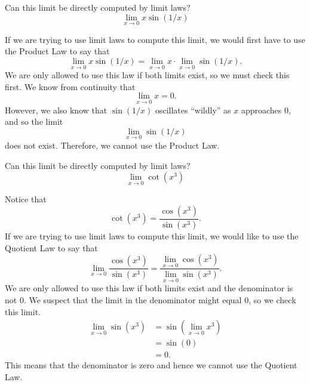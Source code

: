 \documentclass{ximera}
\begin{document}
\begin{question}
  Can this limit be directly computed by limit laws?
  \[
  \lim_{x\to 0} x\sin(1/x)
  \]
  \begin{multipleChoice}
  \end{multipleChoice}
  \begin{feedback}
    If we are trying to use limit laws to compute this limit, we would
    first have to use the Product Law to say that
    \[
    \lim_{x\to 0}x\sin(1/x)= \lim_{x\to 0} x \cdot \lim_{x\to 0} \sin(1/x).
    \]
    We are only allowed to use this law if both limits exist, so we
    must check this first.  We know from continuity that
    \[
    \lim_{x\to  0}x=0.
    \]
    However, we also know that $\sin(1/x)$ oscillates ``wildly'' as
    $x$ approaches $0$, and so the limit
    \[
    \lim_{x\to 0} \sin(1/x)
    \]does not exist.  Therefore, we cannot use the
    Product Law.
  \end{feedback}
\end{question}


\begin{question}
  Can this limit be directly computed by limit laws?
  \[
  \lim_{x\to 0} \cot(x^3)
  \]
  \begin{multipleChoice}
  \end{multipleChoice}
  \begin{feedback}
    Notice that
    \[
    \cot(x^3) = \frac{\cos(x^3)}{\sin(x^3)}.
    \]
    If we are trying to use limit laws to compute this limit, we would
    like to use the Quotient Law to say that
    \[
    \lim_{x\to 0} \frac{\cos(x^3)}{\sin(x^3)} = \frac{\lim_{x\to 0}
      \cos(x^3)}{\lim_{x\to 0} \sin(x^3)}.
    \]
    We are only allowed to use this law if both limits exist and the
    denominator is not $0$. We suspect that the limit in the
    denominator might equal $0$, so we check this limit.
    \begin{align*}
      \lim_{x\to 0} \sin(x^3) &= \sin(\lim_{x\to 0}x^3)\\
      &=\sin(0) \\
      &=0.
  \end{align*}
  This means that the denominator is zero and hence we cannot use the
  Quotient Law.
  \end{feedback}
\end{question}
\end{document}
